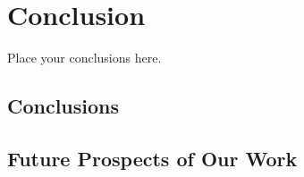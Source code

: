 \chapter{Conclusion}\label{conclusion}
Place your conclusions here.

\section{Conclusions}

\lipsum[23-25]

\section{Future Prospects of Our Work}

\lipsum[33-35]